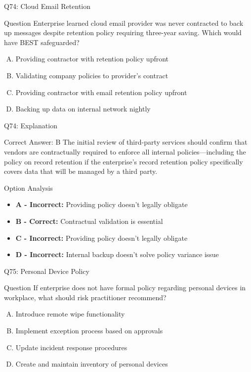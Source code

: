 \documentclass{beamer}
\begin{document}
	\begin{frame}{Q74: Cloud Email Retention}
		\begin{block}{Question}
			Enterprise learned cloud email provider was never contracted to back up messages despite retention policy requiring three-year saving. Which would have BEST safeguarded?
		\end{block}
		\begin{enumerate}[(A)]
			\item Providing contractor with retention policy upfront
			\item Validating company policies to provider's contract
			\item Providing contractor with email retention policy upfront
			\item Backing up data on internal network nightly
		\end{enumerate}
	\end{frame}
	
	\begin{frame}{Q74: Explanation}
		\begin{block}{Correct Answer: B}
			The initial review of third-party services should confirm that vendors are contractually required to enforce all internal policies—including the policy on record retention if the enterprise's record retention policy specifically covers data that will be managed by a third party.
		\end{block}
		\begin{block}{Option Analysis}
			\begin{itemize}
				\item \textbf{A - Incorrect:} Providing policy doesn't legally obligate
				\item \textbf{B - Correct:} Contractual validation is essential
				\item \textbf{C - Incorrect:} Providing policy doesn't legally obligate
				\item \textbf{D - Incorrect:} Internal backup doesn't solve policy variance issue
			\end{itemize}
		\end{block}
	\end{frame}
	
	\begin{frame}{Q75: Personal Device Policy}
		\begin{block}{Question}
			If enterprise does not have formal policy regarding personal devices in workplace, what should risk practitioner recommend?
		\end{block}
		\begin{enumerate}[(A)]
			\item Introduce remote wipe functionality
			\item Implement exception process based on approvals
			\item Update incident response procedures
			\item Create and maintain inventory of personal devices
		\end{enumerate}
	\end{frame}
	
\end{document}
